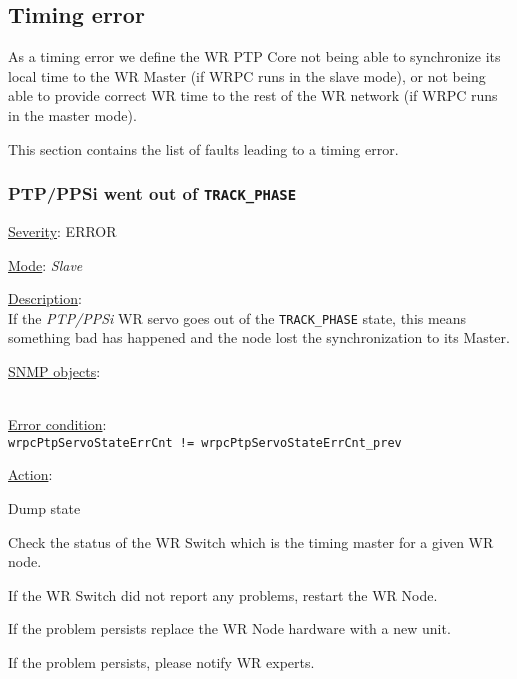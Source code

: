 \subsection{Timing error}
\label{sec:timing_fail}
As a timing error we define the WR PTP Core not being able to synchronize its
local time to the WR Master (if WRPC runs in the slave mode), or not being able
to provide correct WR time to the rest of the WR network (if WRPC runs in the
master mode).

\noindent This section contains the list of faults leading to a timing error.

\subsubsection{\bf PTP/PPSi went out of \texttt{TRACK\_PHASE}}
		\label{fail:timing:ppsi_track_phase}
		\begin{pck_descr}
			\item [] \underline{Severity}: ERROR
			\item [] \underline{Mode}: \emph{Slave}
			\item [] \underline{Description}:\\
				If the \emph{PTP/PPSi} WR servo goes out of the \texttt{TRACK\_PHASE}
				state, this means something bad has happened and the node lost the
				synchronization to its Master.
			\item [] \underline{SNMP objects}:\\
				{\footnotesize
				\\
				 }
			\item [] \underline{Error condition}:\\
				{\footnotesize
				\texttt{wrpcPtpServoStateErrCnt != wrpcPtpServoStateErrCnt\_prev} }
      \item [] \underline{Action}:
        \begin{pck_proc}
        \item Dump state
        \item Check the status of the WR Switch which is the timing master for a
          given WR node.
        \item If the WR Switch did not report any problems, restart the WR Node.
        \item If the problem persists replace the WR Node hardware with a new
          unit.
        \item If the problem persists, please notify WR experts.
        \end{pck_proc}
		\end{pck_descr}

